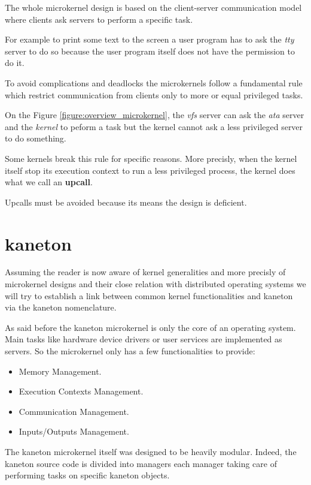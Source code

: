 The whole microkernel design is based on the client-server communication
model where clients ask servers to perform a specific task.

For example to print some text to the screen a user program has to
ask the \textit{tty} server to do so because the user program itself does
not have the permission to do it.

To avoid complications and deadlocks the microkernels follow a fundamental
rule which restrict communication from clients only to more or equal
privileged tasks.

On the Figure \ref{figure:overview_microkernel}, the \textit{vfs} server can
ask the \textit{ata} server and the \textit{kernel} to peform a task but
the kernel cannot ask a less privileged server to do something.

Some kernels break this rule for specific reasons. More precisly,
when the kernel itself stop its execution context to run a less
privileged process, the kernel does what we call an \textbf{upcall}.

Upcalls must be avoided because its means the design is deficient.

\section{kaneton}

Assuming the reader is now aware of kernel generalities and more
precisly of microkernel designs and their close relation with
distributed operating systems we will try to establish a link
between common kernel functionalities and kaneton via the
kaneton nomenclature.

As said before the kaneton microkernel is only the core of an
operating system. Main tasks like hardware device drivers or
user services are implemented as servers. So the microkernel
only has a few functionalities to provide:

\begin{itemize}
  \item
    Memory Management.
  \item
    Execution Contexts Management.
  \item
    Communication Management.
  \item
    Inputs/Outputs Management.
\end{itemize}

The kaneton microkernel itself was designed to be heavily
modular. Indeed, the kaneton source code is divided into managers
each manager taking care of performing tasks on specific kaneton
objects.

